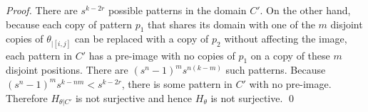 \documentclass[10pt,a4paper]{amsart}
\begin{document}
\begin{proof}
There are $s^{k-2r}$ possible patterns in the domain $C'$. On the other hand, because each copy of pattern $p_1$ that shares its domain with one of the $m$ disjoint copies of $\theta_{|[i,j]}$ can be replaced with a copy of $p_2$ without affecting the image, each pattern in $C'$ has a pre-image with no copies of $p_1$ on a copy of these $m$ disjoint positions. There are $(s^n-1)^m s^{n(k-m)}$ such patterns. Because $(s^n-1)^m s^{k-nm} < s^{k-2r}$,  there is some pattern in $C'$ with no pre-image. Therefore $H_{\theta|C'}$ is not surjective and hence $H_\theta$ is not surjective.
\qed
\end{proof}
\end{document}
